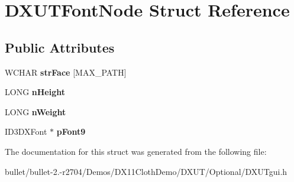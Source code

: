 \hypertarget{struct_d_x_u_t_font_node}{\section{D\+X\+U\+T\+Font\+Node Struct Reference}
\label{struct_d_x_u_t_font_node}
}
\subsection*{Public Attributes}
\begin{DoxyCompactItemize}
\item 
\hypertarget{struct_d_x_u_t_font_node_a38271d76ed025e34ad12db38f3cef3bf}{W\+C\+H\+A\+R {\bfseries str\+Face} \mbox{[}M\+A\+X\+\_\+\+P\+A\+T\+H\mbox{]}}\label{struct_d_x_u_t_font_node_a38271d76ed025e34ad12db38f3cef3bf}

\item 
\hypertarget{struct_d_x_u_t_font_node_a6da65186d482f93c31e2432eed789f0f}{L\+O\+N\+G {\bfseries n\+Height}}\label{struct_d_x_u_t_font_node_a6da65186d482f93c31e2432eed789f0f}

\item 
\hypertarget{struct_d_x_u_t_font_node_a7748eaafd54d1dc428c6f350d1adc725}{L\+O\+N\+G {\bfseries n\+Weight}}\label{struct_d_x_u_t_font_node_a7748eaafd54d1dc428c6f350d1adc725}

\item 
\hypertarget{struct_d_x_u_t_font_node_aa7963980ebc543d0b42babd86791ec86}{I\+D3\+D\+X\+Font $\ast$ {\bfseries p\+Font9}}\label{struct_d_x_u_t_font_node_aa7963980ebc543d0b42babd86791ec86}

\end{DoxyCompactItemize}


The documentation for this struct was generated from the following file\+:\begin{DoxyCompactItemize}
\item 
bullet/bullet-\/2.-\/r2704/\+Demos/\+D\+X11\+Cloth\+Demo/\+D\+X\+U\+T/\+Optional/D\+X\+U\+Tgui.\+h\end{DoxyCompactItemize}
